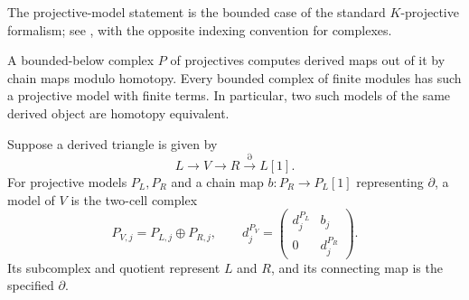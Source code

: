 The projective-model statement is the bounded case of the standard
$K$-projective formalism; see
\cite[Proposition~1.4 and Example~3.2(a)]{Spaltenstein1988}, with the
opposite indexing convention for complexes.

\begin{lemma}\label{h:derived-models}
A bounded-below complex $P$ of projectives computes derived maps out of it
by chain maps modulo homotopy. Every bounded complex of finite modules has
such a projective model with finite terms. In particular, two such models
of the same derived object are homotopy equivalent.

Suppose a derived triangle is given by
\[
 L\longrightarrow V\longrightarrow R\xrightarrow{\partial}L[1].
\]
For projective models $P_L,P_R$ and a chain map
$b:P_R\to P_L[1]$ representing $\partial$, a model of $V$ is the two-cell
complex
\begin{equation}\label{h:two-cell}
 P_{V,j}=P_{L,j}\oplus P_{R,j},\qquad
 d_j^{P_V}=\begin{pmatrix}d_j^{P_L}&b_j\\0&d_j^{P_R}\end{pmatrix}.
\end{equation}
Its subcomplex and quotient represent $L$ and $R$, and its connecting
map is the specified $\partial$.
\end{lemma}

